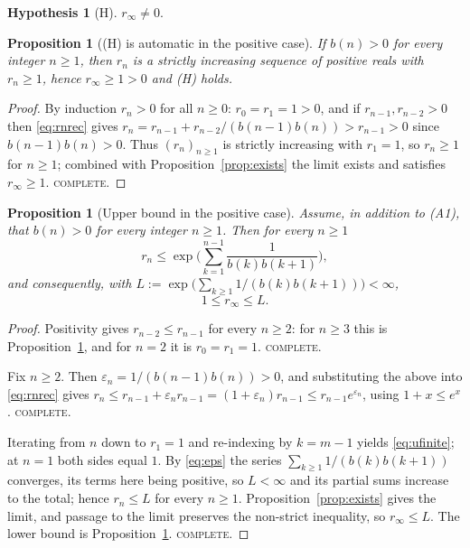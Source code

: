 \documentclass[11pt]{article}
\newtheorem{proposition}[theorem]{Proposition}
\theoremstyle{definition}
\newtheorem{hypothesis}[theorem]{Hypothesis}
\newcommand{\rinf}{r_\infty}
\begin{document}
\begin{hypothesis}[H]\label{hyp:H}
$\rinf\neq0$.
\end{hypothesis}

\begin{proposition}[(H) is automatic in the positive case]\label{prop:positive}
If $b(n)>0$ for every integer $n\ge1$, then $r_n$ is a strictly increasing
sequence of positive reals with $r_n\ge1$, hence $\rinf\ge1>0$ and
\textup{(H)} holds.
\end{proposition}

\begin{proof}
By induction $r_n>0$ for all $n\ge0$: $r_0=r_1=1>0$, and if
$r_{n-1},r_{n-2}>0$ then \eqref{eq:rnrec} gives
$r_n=r_{n-1}+r_{n-2}/(b(n-1)b(n))>r_{n-1}>0$ since $b(n-1)b(n)>0$.
Thus $(r_n)_{n\ge1}$ is strictly increasing with $r_1=1$, so $r_n\ge1$ for
$n\ge1$; combined with Proposition~\ref{prop:exists} the limit exists and
satisfies $\rinf\ge1$. \textsc{complete.}
\end{proof}

\begin{proposition}[Upper bound in the positive case]\label{prop:upper}
Assume, in addition to \textup{(A1)}, that $b(n)>0$ for every integer $n\ge1$.
Then for every $n\ge1$
\begin{equation}\label{eq:ufinite}
r_n\le\exp\Big(\sum_{k=1}^{n-1}\frac{1}{b(k)b(k+1)}\Big),
\end{equation}
and consequently, with
$L:=\exp\big(\sum_{k\ge1}1/(b(k)b(k+1))\big)<\infty$,
\begin{equation}\label{eq:ulimit}
1\le\rinf\le L .
\end{equation}
\end{proposition}

\begin{proof}
Positivity gives $r_{n-2}\le r_{n-1}$ for every $n\ge2$: for $n\ge3$ this is
Proposition~\ref{prop:positive}, and for $n=2$ it is $r_0=r_1=1$.
\textsc{complete.}

Fix $n\ge2$. Then $\varepsilon_n=1/(b(n-1)b(n))>0$, and substituting the above
into \eqref{eq:rnrec} gives
$r_n\le r_{n-1}+\varepsilon_n r_{n-1}=(1+\varepsilon_n)r_{n-1}
\le r_{n-1}e^{\varepsilon_n}$, using $1+x\le e^x$. \textsc{complete.}

Iterating from $n$ down to $r_1=1$ and re-indexing by $k=m-1$ yields
\eqref{eq:ufinite}; at $n=1$ both sides equal $1$. By \eqref{eq:eps} the series
$\sum_{k\ge1}1/(b(k)b(k+1))$ converges, its terms here being positive, so
$L<\infty$ and its partial sums increase to the total; hence $r_n\le L$ for
every $n\ge1$. Proposition~\ref{prop:exists} gives the limit, and passage to
the limit preserves the non-strict inequality, so $\rinf\le L$. The lower bound
is Proposition~\ref{prop:positive}. \textsc{complete.}
\end{proof}
\end{document}
